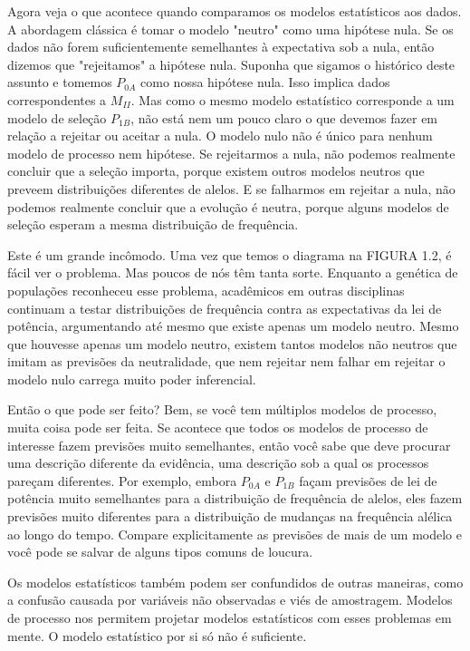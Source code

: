 Agora veja o que acontece quando comparamos os modelos estatísticos aos dados. A abordagem clássica é tomar o modelo "neutro" como uma hipótese nula. Se os dados não forem suficientemente semelhantes à expectativa sob a nula, então dizemos que "rejeitamos" a hipótese nula. Suponha que sigamos o histórico deste assunto e tomemos $P_{0A}$ como nossa hipótese nula. Isso implica dados correspondentes a $M_{II}$. Mas como o mesmo modelo estatístico corresponde a um modelo de seleção $P_{1B}$, não está nem um pouco claro o que devemos fazer em relação a rejeitar ou aceitar a nula. O modelo nulo não é único para nenhum modelo de processo nem hipótese. Se rejeitarmos a nula, não podemos realmente concluir que a seleção importa, porque existem outros modelos neutros que preveem distribuições diferentes de alelos. E se falharmos em rejeitar a nula, não podemos realmente concluir que a evolução é neutra, porque alguns modelos de seleção esperam a mesma distribuição de frequência.

Este é um grande incômodo. Uma vez que temos o diagrama na FIGURA 1.2, é fácil ver o problema. Mas poucos de nós têm tanta sorte. Enquanto a genética de populações reconheceu esse problema, acadêmicos em outras disciplinas continuam a testar distribuições de frequência contra as expectativas da lei de potência, argumentando até mesmo que existe apenas um modelo neutro. Mesmo que houvesse apenas um modelo neutro, existem tantos modelos não neutros que imitam as previsões da neutralidade, que nem rejeitar nem falhar em rejeitar o modelo nulo carrega muito poder inferencial.

Então o que pode ser feito? Bem, se você tem múltiplos modelos de processo, muita coisa pode ser feita. Se acontece que todos os modelos de processo de interesse fazem previsões muito semelhantes, então você sabe que deve procurar uma descrição diferente da evidência, uma descrição sob a qual os processos pareçam diferentes. Por exemplo, embora $P_{0A}$ e $P_{1B}$ façam previsões de lei de potência muito semelhantes para a distribuição de frequência de alelos, eles fazem previsões muito diferentes para a distribuição de mudanças na frequência alélica ao longo do tempo. Compare explicitamente as previsões de mais de um modelo e você pode se salvar de alguns tipos comuns de loucura.

Os modelos estatísticos também podem ser confundidos de outras maneiras, como a confusão causada por variáveis não observadas e viés de amostragem. Modelos de processo nos permitem projetar modelos estatísticos com esses problemas em mente. O modelo estatístico por si só não é suficiente.

